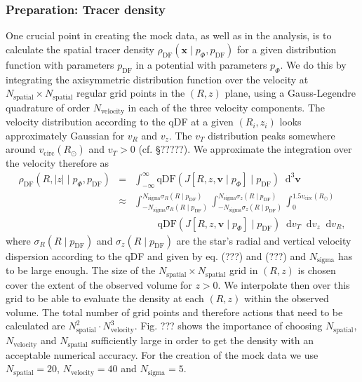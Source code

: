 \documentclass[12pt,preprint]{aastex}
\newcommand{\vect}[1]{\boldsymbol{#1}} %
\newcommand*\diff{\mathop{}\!\mathrm{d}}
\newcommand*\Diff[1]{\mathop{}\!\mathrm{d^#1}}
\begin{document}
\subsubsection{Preparation: Tracer density} \label{sec:density}

One crucial point in creating the mock data, as well as in the analysis, is to calculate the spatial tracer density $\rho_\text{DF}(\vect{x} \mid p_{\Phi},p_\text{DF})$ for a given distribution function with parameters $p_\text{DF}$ in a potential with parameters $p_{\Phi}$. We do this by integrating the axisymmetric distribution function over the velocity at $N_\text{spatial} \times N_\text{spatial}$ regular grid points in the $(R,z)$ plane, using a Gauss-Legendre quadrature of order $N_\text{velocity}$ in each of the three velocity components. The velocity distribution according to the qDF at a given $(R_i,z_i)$ looks approximately Gaussian for $v_R$ and $v_z$. The $v_T$ distribution peaks somewhere around $v_\text{circ}(R_\odot)$ and $v_T > 0$ (cf. \S ?????). We approximate the integration over the velocity therefore as
\begin{eqnarray}
\rho_\text{DF}(R,|z| \mid p_{\Phi},p_\text{DF}) &=& \int_{-\infty}^{\infty} \text{qDF}(J[R,z,\vect{v} \mid p_{\Phi}] \mid p_\text{DF}) \Diff3\vect{v}  \label{eq:tracerdensity_general}\\
&\approx& \int_{-N_\text{sigma} \sigma_R(R \mid p_\text{DF})}^{N_\text{sigma} \sigma_R(R \mid p_\text{DF})} \int_{-N_\text{sigma}\sigma_z(R \mid p_\text{DF})}^{N_\text{sigma} \sigma_z(R \mid p_\text{DF})} \int_{0}^{1.5 v_\text{circ}(R_\odot)}  \nonumber\\
& & \hspace{1cm} \text{qDF}(J[R,z,\vect{v} \mid p_{\Phi}] \mid p_\text{DF}) \diff v_T \diff v_z \diff v_R, \label{eq:tracerdensity}
\end{eqnarray}
where $\sigma_R(R \mid p_\text{DF})$ and $\sigma_z(R \mid p_\text{DF})$ are the star's radial and vertical velocity dispersion according to the qDF and given by eq. (???) and (???) and $N_\text{sigma}$ has to be large enough. The size of the $N_\text{spatial} \times N_\text{spatial}$ grid in $(R,z)$ is chosen cover the extent of the observed volume for $z>0$. We interpolate then over this grid to be able to evaluate the density at each $(R,z)$ within the observed volume. The total number of grid points and therefore actions that need to be calculated are $N_\text{spatial}^2 \cdot N_\text{velocity}^3$. Fig. ??? shows the importance of choosing $N_\text{spatial}$, $N_\text{velocity}$ and $N_\text{spatial}$ sufficiently large in order to get the density with an acceptable numerical accuracy. For the creation of the mock data we use $N_\text{spatial} = 20$, $N_\text{velocity} = 40$ and $N_\text{sigma}=5$.
\end{document}
